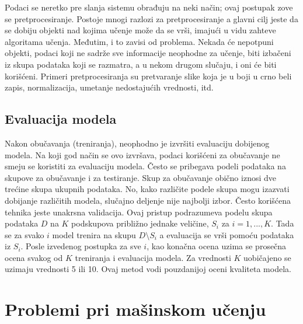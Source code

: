Podaci se neretko pre slanja sistemu obrađuju na neki način; ovaj postupak zove se pretprocesiranje. Postoje mnogi razlozi za pretprocesiranje a glavni cilj jeste da se dobiju objekti nad kojima učenje može da se vrši, imajući u vidu zahteve algoritama učenja. Međutim, i to zavisi od problema. Nekada će nepotpuni objekti, podaci koji ne sadrže sve informacije neophodne za učenje, biti izbačeni iz skupa podataka koji se razmatra, a u nekom drugom slučaju, i oni će biti korišćeni. Primeri pretprocesiranja su pretvaranje slike koja je u boji u crno beli zapis, normalizacija, umetanje nedostajućih vrednosti, itd.

\subsection{Evaluacija modela}

Nakon obučavanja (treniranja), neophodno je izvršiti evaluaciju dobijenog modela. Na koji god način se ovo izvršava, podaci korišćeni za obučavanje ne smeju se koristiti za evaluaciju modela. Često se pribegava podeli podataka na skupove za obučavanje i za testiranje. Skup za obučavanje obično iznosi dve trećine skupa ukupnih podataka. No, kako različite podele skupa mogu izazvati dobijanje različitih modela, slučajno deljenje nije najbolji izbor.  Često korišćena tehnika jeste unakrsna validacija. Ovaj pristup podrazumeva podelu skupa podataka $D$ na $K$ podskupova približno jednake veličine, $S_i$ za $i=1,...,K$. Tada se za svako $i$ model trenira na skupu $D \setminus S_i$ a evaluacija se vrši pomoću podataka iz $S_i$. Posle izvedenog postupka za sve $i$, kao konačna ocena uzima se prosečna ocena svakog od $K$ treniranja i evaluacija modela. Za vrednosti $K$ uobičajeno se uzimaju vrednosti 5 ili 10. Ovaj metod vodi pouzdanijoj oceni kvaliteta modela.

\section{Problemi pri mašinskom učenju}


